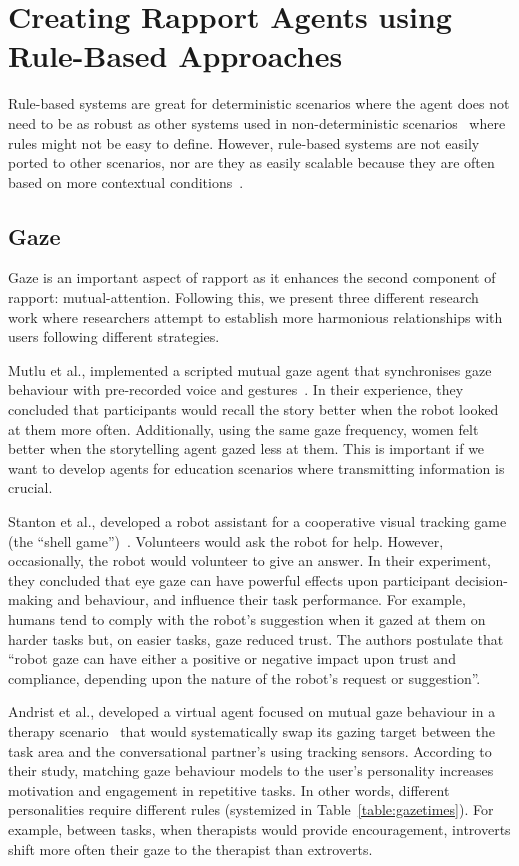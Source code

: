 \section{Creating Rapport Agents using Rule-Based Approaches}
\label{sec:rulebasedAgents}

Rule-based systems are great for deterministic scenarios where the agent does not need to be as robust as other systems used in non-deterministic scenarios~\cite{Mutlu2006} where rules might not be easy to define. However, rule-based systems are not easily ported to other scenarios, nor are they as easily scalable because they are often based on more contextual conditions~\cite{Kok2012}.

\subsection{Gaze}
\label{sub:sec:gaze}

Gaze is an important aspect of rapport as it enhances the second component of rapport: mutual-attention. Following this, we present three different research work where researchers attempt to establish more harmonious relationships with users following different strategies.

Mutlu et al., implemented a scripted mutual gaze agent that synchronises gaze behaviour with pre-recorded voice and gestures~\cite{Mutlu2006}. In their experience, they concluded that participants would recall the story better when the robot looked at them more often. Additionally, using the same gaze frequency, women felt better when the storytelling agent gazed less at them. This is important if we want to develop agents for education scenarios where transmitting information is crucial.

Stanton et al., developed a robot assistant for a cooperative visual tracking game (the ``shell game'')~\cite{Stanton2014}. Volunteers would ask the robot for help. However, occasionally, the robot would volunteer to give an answer. In their experiment, they concluded that eye gaze can have powerful effects upon participant decision-making and behaviour, and influence their task performance. For example, humans tend to comply with the robot's suggestion when it gazed at them on harder tasks but, on easier tasks, gaze reduced trust. The authors postulate that ``robot gaze can have either a positive or negative impact upon trust and compliance, depending upon the nature of the robot’s request or suggestion''.

Andrist et al., developed a virtual agent focused on mutual gaze behaviour in a therapy scenario~\cite{Andrist2015} that would systematically swap its gazing target between the task area and the conversational partner's using tracking sensors. According to their study, matching gaze behaviour models to the user's personality increases motivation and engagement in repetitive tasks. In other words, different personalities require different rules (systemized in Table~\ref{table:gazetimes}). For example, between tasks, when therapists would provide encouragement, introverts shift more often their gaze to the therapist than extroverts.


